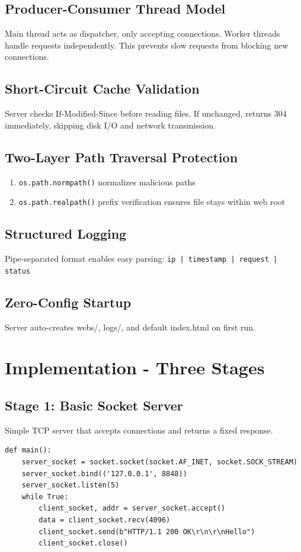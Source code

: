 \documentclass[12pt,a4paper]{article}
\begin{document}
\subsection{Producer-Consumer Thread Model}
Main thread acts as dispatcher, only accepting connections. Worker threads handle requests independently. This prevents slow requests from blocking new connections.

\subsection{Short-Circuit Cache Validation}
Server checks If-Modified-Since before reading files. If unchanged, returns 304 immediately, skipping disk I/O and network transmission.

\subsection{Two-Layer Path Traversal Protection}
\begin{enumerate}
    \item \texttt{os.path.normpath()} normalizes malicious paths
    \item \texttt{os.path.realpath()} prefix verification ensures file stays within web root
\end{enumerate}

\subsection{Structured Logging}
Pipe-separated format enables easy parsing: \texttt{ip | timestamp | request | status}

\subsection{Zero-Config Startup}
Server auto-creates webs/, logs/, and default index.html on first run.

\section{Implementation - Three Stages}

\subsection{Stage 1: Basic Socket Server}
Simple TCP server that accepts connections and returns a fixed response.

\begin{lstlisting}[caption=Basic Server Loop]
def main():
    server_socket = socket.socket(socket.AF_INET, socket.SOCK_STREAM)
    server_socket.bind(('127.0.0.1', 8848))
    server_socket.listen(5)
    while True:
        client_socket, addr = server_socket.accept()
        data = client_socket.recv(4096)
        client_socket.send(b"HTTP/1.1 200 OK\r\n\r\nHello")
        client_socket.close()
\end{lstlisting}
\end{document}
